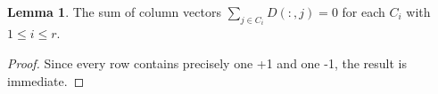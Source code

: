 \documentclass{article}
\theoremstyle{definition}
\newtheorem{lemma}[theorem]{Lemma}
\begin{document}
\begin{lemma}\label{lem:simpleprod}
    The sum of column vectors $\sum_{j\in C_i} D(:,j)=0$ 
    for each $C_i$ with $1\leq i\leq r$.
    

\end{lemma}

\begin{proof}
    Since every row contains precisely one +1 and one -1, the result is immediate.
\end{proof}





% 
\end{document}
